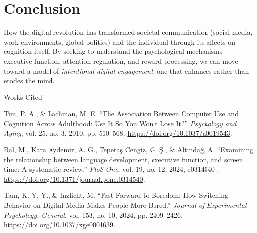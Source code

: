\documentclass[12pt,letterpaper]{article}
\begin{document}
\section*{Conclusion}

How the digital revolution has transformed societal communication (social media, work environments, global politics) and the individual through its affects on cognition itself. By seeking to understand the psychological mechanisms---executive function, attention regulation, and reward processing, we can move toward a model of \textit{intentional digital engagement}: one that enhances rather than erodes the mind.

\newpage

\begin{center}
Works Cited
\end{center}

\noindent Tun, P. A., \& Lachman, M. E. ``The Association Between Computer Use and Cognition Across Adulthood: Use It So You Won't Lose It?'' \textit{Psychology and Aging}, vol. 25, no. 3, 2010, pp. 560--568. \url{https://doi.org/10.1037/a0019543}.

\noindent Bal, M., Kara Aydemir, A. G., Tepetaş Cengiz, G. Ş., \& Altındağ, A. ``Examining the relationship between language development, executive function, and screen time: A systematic review.'' \textit{PloS One}, vol. 19, no. 12, 2024, e0314540-. \url{https://doi.org/10.1371/journal.pone.0314540}.

\noindent Tam, K. Y. Y., \& Inzlicht, M. ``Fast-Forward to Boredom: How Switching Behavior on Digital Media Makes People More Bored.'' \textit{Journal of Experimental Psychology. General}, vol. 153, no. 10, 2024, pp. 2409--2426. \url{https://doi.org/10.1037/xge0001639}.
\end{document}
